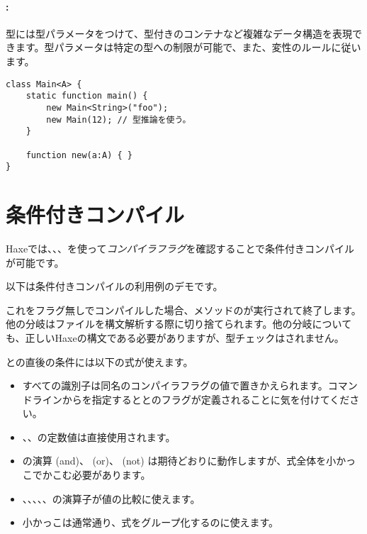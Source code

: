 \paragraph{:}

型には型パラメータをつけて、型付きのコンテナなど複雑なデータ構造を表現できます。型パラメータは特定の型への制限が可能で、また、変性のルールに従います。

\begin{lstlisting}
class Main<A> {
    static function main() {
        new Main<String>("foo");
        new Main(12); // 型推論を使う。
    }

    function new(a:A) { }
}
\end{lstlisting}

\section{条件付きコンパイル}
\label{lf-condition-compilation}

Haxeでは、、、を使って\emph{コンパイラフラグ}を確認することで条件付きコンパイルが可能です。


以下は条件付きコンパイルの利用例のデモです。


これをフラグ無しでコンパイルした場合、メソッドのが実行されて終了します。他の分岐はファイルを構文解析する際に切り捨てられます。他の分岐についても、正しいHaxeの構文である必要がありますが、型チェックはされません。

との直後の条件には以下の式が使えます。

\begin{itemize}
	\item すべての識別子は同名のコンパイラフラグの値で置きかえられます。コマンドラインからを指定するととのフラグが定義されることに気を付けてください。
	\item {}、、の定数値は直接使用されます。
		\item {}の演算\expr{\&\&} (and)、\expr{||} (or)、\expr{!} (not) は期待どおりに動作しますが、式全体を小かっこでかこむ必要があります。
	\item \expr{==}、\expr{!=}、\expr{>}、\expr{>=}、\expr{<}、\expr{<=}の演算子が値の比較に使えます。
	\item 小かっこ\expr{()}は通常通り、式をグループ化するのに使えます。
\end{itemize}

